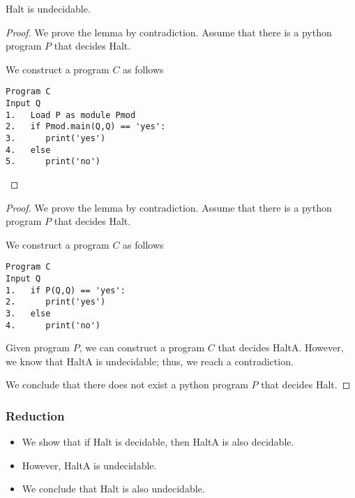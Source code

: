 
\begin{frame}[fragile=true]
  \begin{lemma}
    {\sc Halt} is undecidable.
  \end{lemma}
  \begin{proof}
    We prove the lemma by contradiction.  Assume that there is a
    python program $P$ that decides {\sc Halt}. \pause

    We construct a program $C$ as follows
    {\small
\begin{verbatim}
Program C
Input Q
1.   Load P as module Pmod
2.   if Pmod.main(Q,Q) == 'yes':
3.      print('yes')
4.   else
5.      print('no')
\end{verbatim}
}
  \end{proof}
\end{frame}

\begin{frame}[fragile=true]
  \begin{proof}
    We prove the lemma by contradiction.  Assume that there is a
    python program $P$ that decides {\sc Halt}.

    We construct a program $C$ as follows
    {\small
\begin{verbatim}
Program C
Input Q
1.   if P(Q,Q) == 'yes':
2.      print('yes')
3.   else
4.      print('no')
\end{verbatim}
    }

    \pause

    Given program $P$, we can construct a program $C$ that decides
    {\sc HaltA}.  \pause However, we know that {\sc HaltA} is
    undecidable; thus, we reach a contradiction.

    We conclude that there does not exist a python program $P$ that
    decides {\sc Halt}.
  \end{proof}
\end{frame}

\begin{frame}
  \frametitle{Reduction}
  \pause

  \begin{itemize}
  \item We show that if {\sc Halt} is decidable, then {\sc HaltA} is
    also decidable.
    \pause
  \item However, {\sc HaltA is undecidable}.
    \pause
  \item We conclude that {\sc Halt} is also undecidable.
  \end{itemize}
\end{frame}

